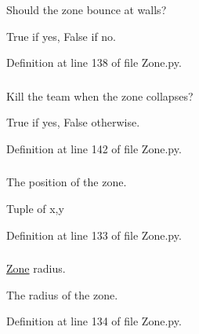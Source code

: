 Should the zone bounce at walls? 

True if yes, False if no. 

Definition at line 138 of file Zone.py.

\hypertarget{class_zone_1_1_zone_a45db96faa826bf1e485c70da9c07d83e}{
\subsubsection[{killteam}]{}}
\label{class_zone_1_1_zone_a45db96faa826bf1e485c70da9c07d83e}


Kill the team when the zone collapses? 

True if yes, False otherwise. 

Definition at line 142 of file Zone.py.

\hypertarget{class_zone_1_1_zone_ae30b162378f40661dfcb854ec7926bdb}{
\subsubsection[{position}]{}}
\label{class_zone_1_1_zone_ae30b162378f40661dfcb854ec7926bdb}


The position of the zone. 

Tuple of x,y 

Definition at line 133 of file Zone.py.

\hypertarget{class_zone_1_1_zone_a6ee5fd031ade8ecb6b2f41455ad309c4}{
\subsubsection[{radius}]{}}
\label{class_zone_1_1_zone_a6ee5fd031ade8ecb6b2f41455ad309c4}


\hyperlink{class_zone_1_1_zone}{Zone} radius. 

The radius of the zone. 

Definition at line 134 of file Zone.py.

\hypertarget{class_zone_1_1_zone_a57b65c53ff747cf9504c88ff37d7b9ee}{
\subsubsection[{settings}]{}}
\label{class_zone_1_1_zone_a57b65c53ff747cf9504c88ff37d7b9ee}


